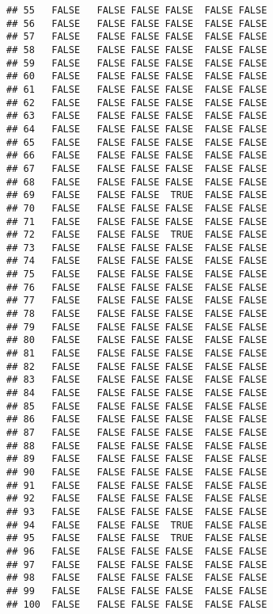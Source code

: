 \documentclass[
]{article}
\newenvironment{Shaded}{\begin{snugshade}}{\end{snugshade}}
\newcommand{\DecValTok}[1]{\textcolor[rgb]{0.00,0.00,0.81}{#1}}
\newcommand{\FunctionTok}[1]{\textcolor[rgb]{0.00,0.00,0.00}{#1}}
\newcommand{\NormalTok}[1]{#1}
\newcommand{\SpecialCharTok}[1]{\textcolor[rgb]{0.00,0.00,0.00}{#1}}
\begin{document}
\begin{verbatim}
## 55   FALSE   FALSE FALSE FALSE  FALSE FALSE
## 56   FALSE   FALSE FALSE FALSE  FALSE FALSE
## 57   FALSE   FALSE FALSE FALSE  FALSE FALSE
## 58   FALSE   FALSE FALSE FALSE  FALSE FALSE
## 59   FALSE   FALSE FALSE FALSE  FALSE FALSE
## 60   FALSE   FALSE FALSE FALSE  FALSE FALSE
## 61   FALSE   FALSE FALSE FALSE  FALSE FALSE
## 62   FALSE   FALSE FALSE FALSE  FALSE FALSE
## 63   FALSE   FALSE FALSE FALSE  FALSE FALSE
## 64   FALSE   FALSE FALSE FALSE  FALSE FALSE
## 65   FALSE   FALSE FALSE FALSE  FALSE FALSE
## 66   FALSE   FALSE FALSE FALSE  FALSE FALSE
## 67   FALSE   FALSE FALSE FALSE  FALSE FALSE
## 68   FALSE   FALSE FALSE FALSE  FALSE FALSE
## 69   FALSE   FALSE FALSE  TRUE  FALSE FALSE
## 70   FALSE   FALSE FALSE FALSE  FALSE FALSE
## 71   FALSE   FALSE FALSE FALSE  FALSE FALSE
## 72   FALSE   FALSE FALSE  TRUE  FALSE FALSE
## 73   FALSE   FALSE FALSE FALSE  FALSE FALSE
## 74   FALSE   FALSE FALSE FALSE  FALSE FALSE
## 75   FALSE   FALSE FALSE FALSE  FALSE FALSE
## 76   FALSE   FALSE FALSE FALSE  FALSE FALSE
## 77   FALSE   FALSE FALSE FALSE  FALSE FALSE
## 78   FALSE   FALSE FALSE FALSE  FALSE FALSE
## 79   FALSE   FALSE FALSE FALSE  FALSE FALSE
## 80   FALSE   FALSE FALSE FALSE  FALSE FALSE
## 81   FALSE   FALSE FALSE FALSE  FALSE FALSE
## 82   FALSE   FALSE FALSE FALSE  FALSE FALSE
## 83   FALSE   FALSE FALSE FALSE  FALSE FALSE
## 84   FALSE   FALSE FALSE FALSE  FALSE FALSE
## 85   FALSE   FALSE FALSE FALSE  FALSE FALSE
## 86   FALSE   FALSE FALSE FALSE  FALSE FALSE
## 87   FALSE   FALSE FALSE FALSE  FALSE FALSE
## 88   FALSE   FALSE FALSE FALSE  FALSE FALSE
## 89   FALSE   FALSE FALSE FALSE  FALSE FALSE
## 90   FALSE   FALSE FALSE FALSE  FALSE FALSE
## 91   FALSE   FALSE FALSE FALSE  FALSE FALSE
## 92   FALSE   FALSE FALSE FALSE  FALSE FALSE
## 93   FALSE   FALSE FALSE FALSE  FALSE FALSE
## 94   FALSE   FALSE FALSE  TRUE  FALSE FALSE
## 95   FALSE   FALSE FALSE  TRUE  FALSE FALSE
## 96   FALSE   FALSE FALSE FALSE  FALSE FALSE
## 97   FALSE   FALSE FALSE FALSE  FALSE FALSE
## 98   FALSE   FALSE FALSE FALSE  FALSE FALSE
## 99   FALSE   FALSE FALSE FALSE  FALSE FALSE
## 100  FALSE   FALSE FALSE FALSE  FALSE FALSE
\end{verbatim}

\begin{Shaded}
\end{Shaded}
\end{document}
